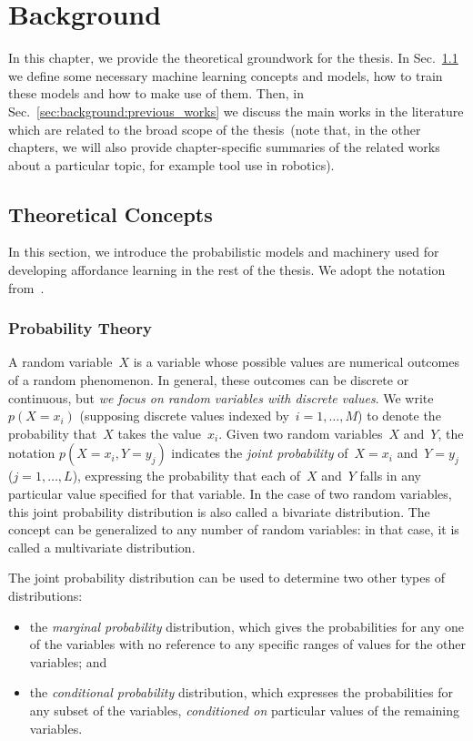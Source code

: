 
\chapter{Background}
\label{chap:background}

In this chapter, we provide the theoretical groundwork for the thesis.
In Sec.~\ref{sec:background:theory} we define some necessary machine learning concepts and models, how to train these models and how to make use of them.
Then, in Sec.~\ref{sec:background:previous_works} we discuss the main works in the literature which are related to the broad scope of the thesis~(note that, in the other chapters, we will also provide chapter-specific summaries of the related works about a particular topic, for example tool use in robotics).

\section{Theoretical Concepts}
\label{sec:background:theory}

In this section, we introduce the probabilistic models and machinery used for developing affordance learning in the rest of the thesis.
We adopt the notation from~\cite{bishop:prml}.

\subsection{Probability Theory}
\label{sec:background:theory:probability}

A random variable~$X$ is a variable whose possible values are numerical outcomes of a random phenomenon.
In general, these outcomes can be discrete or continuous, but \emph{we focus on random variables with discrete values}.
We write~$p(X = x_i)$ (supposing discrete values indexed by~$i = 1, \dots, M$) to denote the probability that~$X$ takes the value~$x_i$.
Given two random variables~$X$ and~$Y$, the notation $p(X=x_i, Y=y_j)$ indicates the \emph{joint probability} of~$X = x_i$ and~$Y = y_j$ ($j = 1, \dots, L$), expressing the probability that each of~$X$ and~$Y$ falls in any particular value specified for that variable.
In the case of two random variables, this joint probability distribution is also called a bivariate distribution.
The concept can be generalized to any number of random variables: in that case, it is called a multivariate distribution.

The joint probability distribution can be used to determine two other types of distributions:
\begin{itemize}
    \item the \emph{marginal probability} distribution, which gives the probabilities for any one of the variables with no reference to any specific ranges of values for the other variables; and

    \item the \emph{conditional probability} distribution, which expresses the probabilities for any subset of the variables, \emph{conditioned on} particular values of the remaining variables.
\end{itemize}

